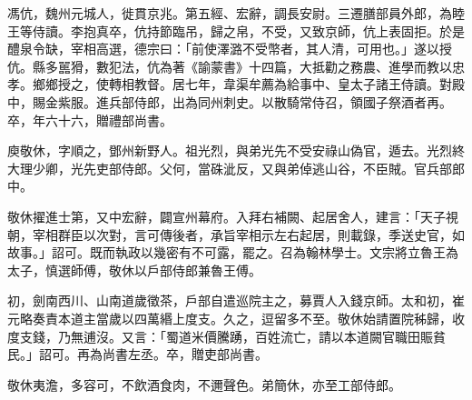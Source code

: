 \begin{pinyinscope}
 馮伉，魏州元城人，徙貫京兆。第五經、宏辭，調長安尉。三遷膳部員外郎，為睦王等侍讀。李抱真卒，伉持節臨吊，歸之帛，不受，又致京師，伉上表固拒。於是醴泉令缺，宰相高選，德宗曰：「前使澤潞不受幣者，其人清，可用也。」遂以授伉。縣多嚚猾，數犯法，伉為著《諭蒙書》十四篇，大抵勸之務農、進學而教以忠孝。鄉鄉授之，使轉相教督。居七年，韋渠牟薦為給事中、皇太子諸王侍讀。對殿中，賜金紫服。進兵部侍郎，出為同州刺史。以散騎常侍召，領國子祭酒者再。卒，年六十六，贈禮部尚書。



 庾敬休，字順之，鄧州新野人。祖光烈，與弟光先不受安祿山偽官，遁去。光烈終大理少卿，光先吏部侍郎。父何，當硃泚反，又與弟倬逃山谷，不臣賊。官兵部郎中。



 敬休擢進士第，又中宏辭，闢宣州幕府。入拜右補闕、起居舍人，建言：「天子視朝，宰相群臣以次對，言可傳後者，承旨宰相示左右起居，則載錄，季送史官，如故事。」詔可。既而執政以幾密有不可露，罷之。召為翰林學士。文宗將立魯王為太子，慎選師傅，敬休以戶部侍郎兼魯王傅。



 初，劍南西川、山南道歲徵茶，戶部自遣巡院主之，募賈人入錢京師。太和初，崔元略奏責本道主當歲以四萬緡上度支。久之，逗留多不至。敬休始請置院秭歸，收度支錢，乃無逋沒。又言：「蜀道米價騰踴，百姓流亡，請以本道闕官職田賑貧民。」詔可。再為尚書左丞。卒，贈吏部尚書。



 敬休夷澹，多容可，不飲酒食肉，不邇聲色。弟簡休，亦至工部侍郎。



\end{pinyinscope}